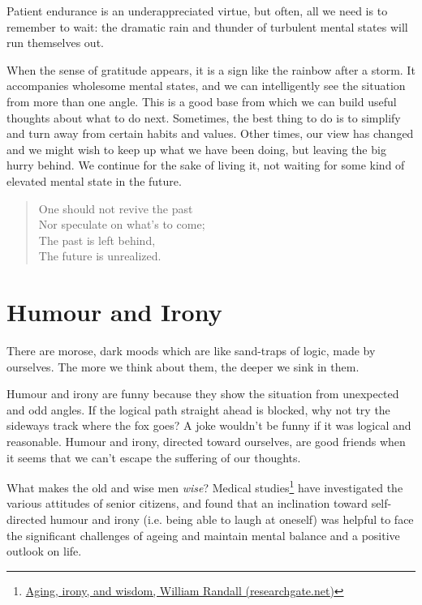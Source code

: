 
Patient endurance is an underappreciated virtue, but often, all we need
is to remember to wait: the dramatic rain and thunder of turbulent
mental states will run themselves out.

When the sense of gratitude appears, it is a sign like the rainbow after
a storm. It accompanies wholesome mental states, and we can
intelligently see the situation from more than one angle. This is a good
base from which we can build useful thoughts about what to do next.
Sometimes, the best thing to do is to simplify and turn away from
certain habits and values. Other times, our view has changed and we
might wish to keep up what we have been doing, but leaving the big hurry
behind. We continue for the sake of living it, not waiting for some kind
of elevated mental state in the future.

\begin{quote}
One should not revive the past\\
Nor speculate on what's to come;\\
The past is left behind,\\
The future is unrealized.

\bigskip

\end{quote}

\section{Humour and Irony}


\noindent There are morose, dark moods which are like sand-traps of
logic, made by ourselves. The more we think about them, the deeper we
sink in them.

Humour and irony are funny because they show the situation from
unexpected and odd angles. If the logical path straight ahead is
blocked, why not try the sideways track where the fox goes? A joke
wouldn't be funny if it was logical and reasonable. Humour and irony,
directed toward ourselves, are good friends when it seems that we can't
escape the suffering of our thoughts.

What makes the old and wise men \emph{wise}? Medical studies\footnote{\href{https://www.researchgate.net/publication/258190619_Aging_irony_and_wisdom_On_the_narrative_psychology_of_later_life}{Aging,
  irony, and wisdom, William Randall (researchgate.net)}} have
investigated the various attitudes of senior citizens, and found that an
inclination toward self-directed humour and irony (i.e. being able to
laugh at oneself) was helpful to face the significant challenges of
ageing and maintain mental balance and a positive outlook on life.

